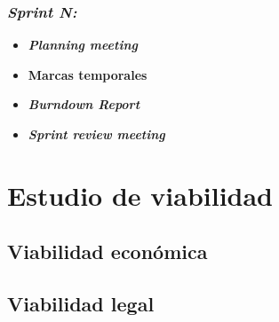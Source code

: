 \subsubsection{\textit{Sprint N: }}
\begin{itemize}
	\item \textbf{\textit{Planning meeting}}
	\item \textbf{Marcas temporales}		
	\item \textbf{\textit{Burndown Report}}
	\item \textbf{\textit{Sprint review meeting}}
\end{itemize}


\section{Estudio de viabilidad}

\subsection{Viabilidad económica}

\subsection{Viabilidad legal}


